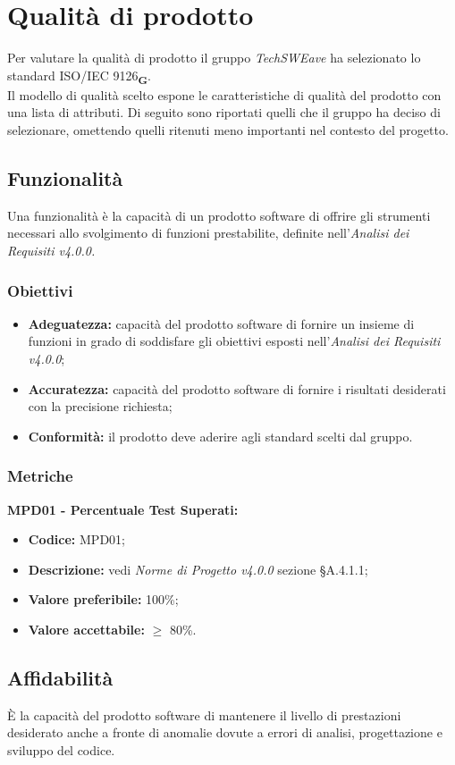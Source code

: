 \section{Qualità di prodotto}
Per valutare la qualità di prodotto il gruppo  \textit{TechSWEave} ha selezionato lo standard ISO/IEC 9126\textsubscript{\textbf{G}}.\\
Il modello di qualità scelto espone le caratteristiche di qualità del prodotto con una lista di attributi. Di seguito sono riportati quelli che il
gruppo ha deciso di selezionare, omettendo quelli ritenuti meno importanti nel contesto del progetto.
\subsection{Funzionalità}
Una funzionalità è la capacità di un prodotto software di offrire gli strumenti necessari allo svolgimento di funzioni prestabilite, definite
nell'\textit{Analisi dei Requisiti v4.0.0.}
\subsubsection{Obiettivi}
\begin{itemize}
    \item \textbf{Adeguatezza:} capacità del prodotto software di fornire un insieme di funzioni in grado
          di soddisfare gli obiettivi esposti nell’\textit{Analisi dei Requisiti v4.0.0};
    \item \textbf{Accuratezza:} capacità del prodotto software di fornire i risultati desiderati con la precisione richiesta;
    \item \textbf{Conformità:} il prodotto deve aderire agli standard scelti dal gruppo.
\end{itemize}
\subsubsection{Metriche}
\textbf{MPD01 - Percentuale Test Superati:}
\begin{itemize}
    \item \textbf{Codice:} MPD01;
    \item \textbf{Descrizione:} vedi \textit{Norme di Progetto v4.0.0} sezione \S A.4.1.1;
    \item \textbf{Valore preferibile:} 100\%;
    \item \textbf{Valore accettabile:} $\geq$ 80\%.
\end{itemize}
\subsection{Affidabilità}
È la capacità del prodotto software di mantenere il livello di prestazioni
desiderato anche a fronte di anomalie dovute a errori di analisi, progettazione e sviluppo del codice.

